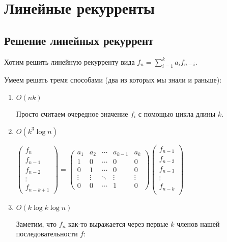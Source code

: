 ﻿

\section{Линейные рекурренты}

\subsection{Решение линейных рекуррент}

Хотим решить линейную рекурренту вида $f_n = \sum\limits_{i=1}^k a_i f_{n-i}$.

Умеем решать тремя способами (два из которых мы знали и раньше):

\begin{enumerate}
	\item 
		$O(nk)$

		Просто считаем очередное значение $f_i$ с помощью цикла длины $k$.

	\item 
		$O(k^3 \log n)$

		$\begin{pmatrix}
			f_n     \\
			f_{n-1} \\
			f_{n-2} \\
			\vdots  \\
			f_{n-k+1} 
		\end{pmatrix}
		=
		\begin{pmatrix}
			a_1      & a_2    & \cdots & a_{k-1} & a_k    \\
			1        & 0      & \cdots & 0       & 0      \\         
			0        & 1      & \cdots & 0       & 0      \\         
			\vdots   & \vdots & \ddots & \vdots  & \vdots \\
			0        & 0      & \cdots & 1       & 0
		\end{pmatrix}
		\begin{pmatrix}
			f_{n-1} \\
			f_{n-2} \\
			f_{n-3} \\
			\vdots  \\
			f_{n-k} \\
		\end{pmatrix}$
	
	\item
		$O(k \log k \log n)$

		Заметим, что $f_n$ как-то выражается через первые $k$ членов нашей последовательности $f$:


\end{enumerate}
